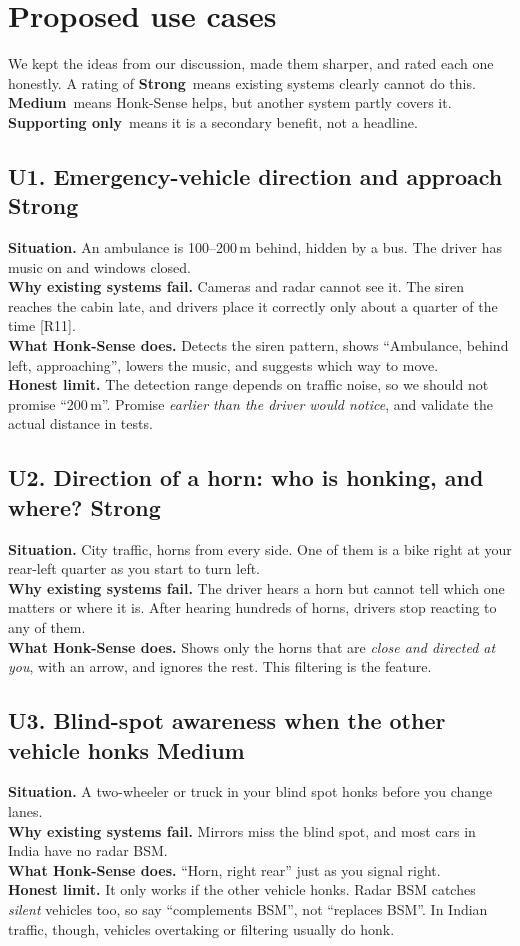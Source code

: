 \documentclass[11pt]{article}
\newcommand{\strong}{{\color{ok}\bfseries Strong}}
\newcommand{\medium}{{\color{amber}\bfseries Medium}}
\newcommand{\weak}{{\color{alert}\bfseries Supporting only}}
\renewcommand{\cite}[1]{{\color{navy}[#1]}}
\begin{document}
\section{Proposed use cases}
We kept the ideas from our discussion, made them sharper, and rated each one honestly. A rating of \strong\ means existing systems clearly cannot do this. \medium\ means Honk-Sense helps, but another system partly covers it. \weak\ means it is a secondary benefit, not a headline.

\subsection{U1. Emergency-vehicle direction and approach \hfill \strong}
\textbf{Situation.} An ambulance is 100--200\,m behind, hidden by a bus. The driver has music on and windows closed.\\
\textbf{Why existing systems fail.} Cameras and radar cannot see it. The siren reaches the cabin late, and drivers place it correctly only about a quarter of the time \cite{R11}.\\
\textbf{What Honk-Sense does.} Detects the siren pattern, shows ``Ambulance, behind left, approaching'', lowers the music, and suggests which way to move.\\
\textbf{Honest limit.} The detection range depends on traffic noise, so we should not promise ``200\,m''. Promise \emph{earlier than the driver would notice}, and validate the actual distance in tests.

\subsection{U2. Direction of a horn: who is honking, and where? \hfill \strong}
\textbf{Situation.} City traffic, horns from every side. One of them is a bike right at your rear-left quarter as you start to turn left.\\
\textbf{Why existing systems fail.} The driver hears a horn but cannot tell which one matters or where it is. After hearing hundreds of horns, drivers stop reacting to any of them.\\
\textbf{What Honk-Sense does.} Shows only the horns that are \emph{close and directed at you}, with an arrow, and ignores the rest. This filtering is the feature.

\subsection{U3. Blind-spot awareness when the other vehicle honks \hfill \medium}
\textbf{Situation.} A two-wheeler or truck in your blind spot honks before you change lanes.\\
\textbf{Why existing systems fail.} Mirrors miss the blind spot, and most cars in India have no radar BSM.\\
\textbf{What Honk-Sense does.} ``Horn, right rear'' just as you signal right.\\
\textbf{Honest limit.} It only works if the other vehicle honks. Radar BSM catches \emph{silent} vehicles too, so say ``complements BSM'', not ``replaces BSM''. In Indian traffic, though, vehicles overtaking or filtering usually do honk.
\end{document}
